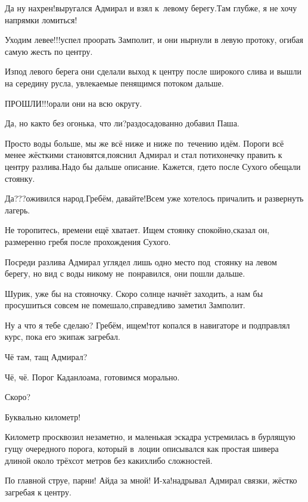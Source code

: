 \diagdash Да ну нахрен!\mdash выругался Адмирал и взял к~левому берегу.\mdash Там глубже, я не хочу напрямки ломиться!



\diagdash Уходим левее!!!\mdash успел проорать Замполит, и они нырнули в левую протоку, огибая самую жесть по центру.

Из\sdash под левого берега они сделали выход к центру после широкого слива и вышли на середину русла, увлекаемые пенящимся потоком дальше.

\diagdash ПРОШЛИ!!!\mdash орали они на всю округу.

\diagdash Да, но как\sdash то без огонька, что ли?\mdash раздосадованно добавил Паша.

\diagdash Просто воды больше, мы же всё ниже и ниже по~течению идём. Пороги всё менее жёсткими становятся,\mdash пояснил Адмирал и стал потихонечку править к центру разлива.\mdash Надо бы дальше описание. Кажется, где\sdash то после Сухого обещали стоянку.

\diagdash Да???\mdash оживился народ.\mdash Гребём, давайте!\mdash Всем уже хотелось причалить и развернуть лагерь.

\diagdash Не торопитесь, времени ещё хватает. Ищем стоянку спокойно,\mdash сказал он, размеренно гребя после прохождения Сухого.

Посреди разлива Адмирал углядел лишь одно место под~стоянку на левом берегу, но вид с воды никому не~понравился, они пошли дальше.

\diagdash Шурик, уже бы на стояночку. Скоро солнце начнёт заходить, а нам бы просушиться совсем не помешало,\mdash справедливо заметил Замполит.

\diagdash Ну а что я тебе сделаю? Гребём, ищем!\mdash тот копался в навигаторе и подправлял курс, пока его экипаж загребал.

\diagdash Чё там, тащ Адмирал?

\diagdash Чё, чё. Порог Каданлоама, готовимся морально.

\diagdash Скоро? 

\diagdash Буквально километр!

Километр просквозил незаметно, и маленькая эскадра устремилась в бурлящую гущу очередного порога, который в~лоции описывался как простая шивера длиной около трёхсот метров без каких\sdash либо сложностей.

\diagdash По главной струе, парни! Айда за мной! И-ха!\mdash надрывал Адмирал связки, жёстко загребая к центру.

